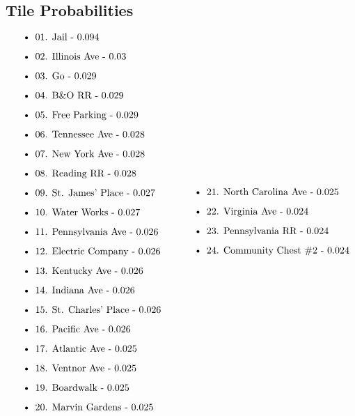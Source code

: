 \documentclass[12pt]{article}
\begin{document}
\subsection{Tile Probabilities}
\begin{align*}
\label{Tile Probabilities}
\centering
\begin{minipage}{0.5\textwidth}
\begin{flushleft}
\begin{itemize}
  \item {01. Jail - 0.094}
  \item {02. Illinois Ave - 0.03}
  \item {03. Go - 0.029}
  \item {04. B\&O RR - 0.029}
  \item {05. Free Parking - 0.029}
  \item {06. Tennessee Ave - 0.028}
  \item {07. New York Ave - 0.028}
  \item {08. Reading RR - 0.028}
  \item {09. St. James' Place - 0.027}
  \item {10. Water Works - 0.027}
  \item {11. Pennsylvania Ave - 0.026}
  \item {12. Electric Company - 0.026}
  \item {13. Kentucky Ave - 0.026}
  \item {14. Indiana Ave - 0.026}
  \item {15. St. Charles' Place - 0.026}
  \item {16. Pacific Ave - 0.026}
  \item {17. Atlantic Ave - 0.025}
  \item {18. Ventnor Ave - 0.025}
  \item {19. Boardwalk - 0.025}
  \item {20. Marvin Gardens - 0.025}
\end{itemize}
\end{flushleft}
\end{minipage}
~
\begin{minipage}{0.5\textwidth}
\begin{flushleft}
\begin{itemize}
  \item {21. North Carolina Ave - 0.025}
  \item {22. Virginia Ave - 0.024}
  \item {23. Pennsylvania RR - 0.024}
  \item {24. Community Chest \#2 - 0.024}

\end{itemize}
\end{flushleft}
\end{minipage}
\end{align*}
\end{document}
